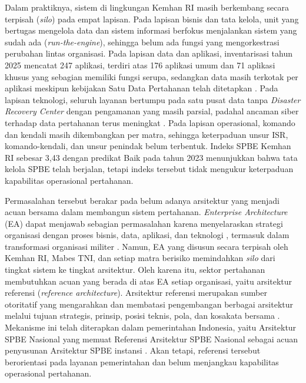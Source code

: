 Dalam praktiknya, sistem di lingkungan Kemhan RI masih berkembang secara terpisah (\textit{silo}) pada empat lapisan. Pada lapisan bisnis dan tata kelola, unit yang bertugas mengelola data dan sistem informasi \cite{Permenhan30Tahun2025} berfokus menjalankan sistem yang sudah ada (\textit{run-the-engine}), sehingga belum ada fungsi yang mengorkestrasi perubahan lintas organisasi. Pada lapisan data dan aplikasi, inventarisasi tahun 2025 mencatat 247 aplikasi, terdiri atas 176 aplikasi umum dan 71 aplikasi khusus yang sebagian memiliki fungsi serupa, sedangkan data masih terkotak per aplikasi meskipun kebijakan Satu Data Pertahanan telah ditetapkan \cite{Permenhan1Tahun2023}. Pada lapisan teknologi, seluruh layanan bertumpu pada satu pusat data tanpa \textit{Disaster Recovery Center} dengan pengamanan yang masih parsial, padahal ancaman siber terhadap data pertahanan terus meningkat \cite{Permenhan82Tahun2014}. Pada lapisan operasional, komando dan kendali masih dikembangkan per matra, sehingga keterpaduan unsur ISR\label{sk:ISR}, komando-kendali, dan unsur penindak belum terbentuk. Indeks SPBE Kemhan RI sebesar 3,43 dengan predikat Baik pada tahun 2023 \cite{Pusdatin2024} menunjukkan bahwa tata kelola SPBE telah berjalan, tetapi indeks tersebut tidak mengukur keterpaduan kapabilitas operasional pertahanan.

Permasalahan tersebut berakar pada belum adanya arsitektur yang menjadi acuan bersama dalam membangun sistem pertahanan. \textit{Enterprise Architecture} (EA\label{sk:EA}) dapat menjawab sebagian permasalahan karena menyelaraskan strategi organisasi dengan proses bisnis, data, aplikasi, dan teknologi \cite{Syamfithriani2024}, termasuk dalam transformasi organisasi militer \cite{Mattila2022}. Namun, EA yang disusun secara terpisah oleh Kemhan RI, Mabes\label{sk:Mabes} TNI, dan setiap matra berisiko memindahkan \textit{silo} dari tingkat sistem ke tingkat arsitektur. Oleh karena itu, sektor pertahanan membutuhkan acuan yang berada di atas EA setiap organisasi, yaitu arsitektur referensi (\textit{reference architecture}). Arsitektur referensi merupakan sumber otoritatif yang mengarahkan dan membatasi pengembangan berbagai arsitektur melalui tujuan strategis, prinsip, posisi teknis, pola, dan kosakata bersama \cite{DoDCIO2010RA}. Mekanisme ini telah diterapkan dalam pemerintahan Indonesia, yaitu Arsitektur SPBE Nasional yang memuat Referensi Arsitektur SPBE Nasional sebagai acuan penyusunan Arsitektur SPBE instansi \cite{Perpres95Tahun2018,Perpres132Tahun2022}. Akan tetapi, referensi tersebut berorientasi pada layanan pemerintahan dan belum menjangkau kapabilitas operasional pertahanan.

